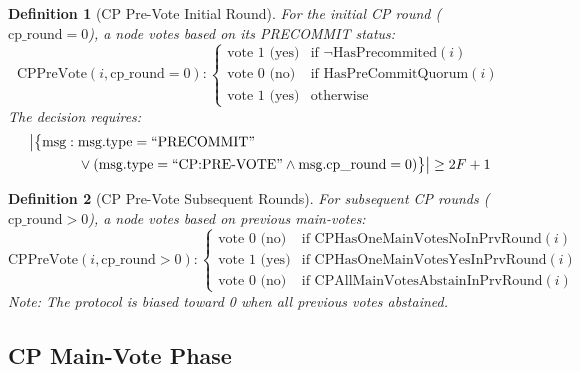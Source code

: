 \documentclass[11pt,a4paper,twoside]{article}
\newtheorem{definition}{Definition}[section]
\begin{document}
\begin{definition}[CP Pre-Vote Initial Round]
For the initial CP round ($\text{cp\_round} = 0$), a node votes based on its PRECOMMIT status:
\begin{equation}
\text{CPPreVote}(i, \text{cp\_round} = 0) :
\begin{cases}
\text{vote 1 (yes)} & \text{if } \neg\text{HasPrecommited}(i) \\[0.3em]
\text{vote 0 (no)} & \text{if HasPreCommitQuorum}(i) \\[0.3em]
\text{vote 1 (yes)} & \text{otherwise}
\end{cases}
\end{equation}
The decision requires:
\begin{align}
\big|\big\{\text{msg} : {} & \text{msg.type} = \text{``PRECOMMIT''} \notag \\
& \lor (\text{msg.type} = \text{``CP:PRE-VOTE''} \land \text{msg.cp\_round} = 0)\big\}\big| \geq 2F + 1
\end{align}
\end{definition}

\begin{definition}[CP Pre-Vote Subsequent Rounds]
For subsequent CP rounds ($\text{cp\_round} > 0$), a node votes based on previous main-votes:
\begin{equation}
\text{CPPreVote}(i, \text{cp\_round} > 0) :
\begin{cases}
\text{vote 0 (no)} & \text{if CPHasOneMainVotesNoInPrvRound}(i) \\[0.3em]
\text{vote 1 (yes)} & \text{if CPHasOneMainVotesYesInPrvRound}(i) \\[0.3em]
\text{vote 0 (no)} & \text{if CPAllMainVotesAbstainInPrvRound}(i)
\end{cases}
\end{equation}
Note: The protocol is biased toward 0 when all previous votes abstained.
\end{definition}

\subsection{CP Main-Vote Phase}
\end{document}

